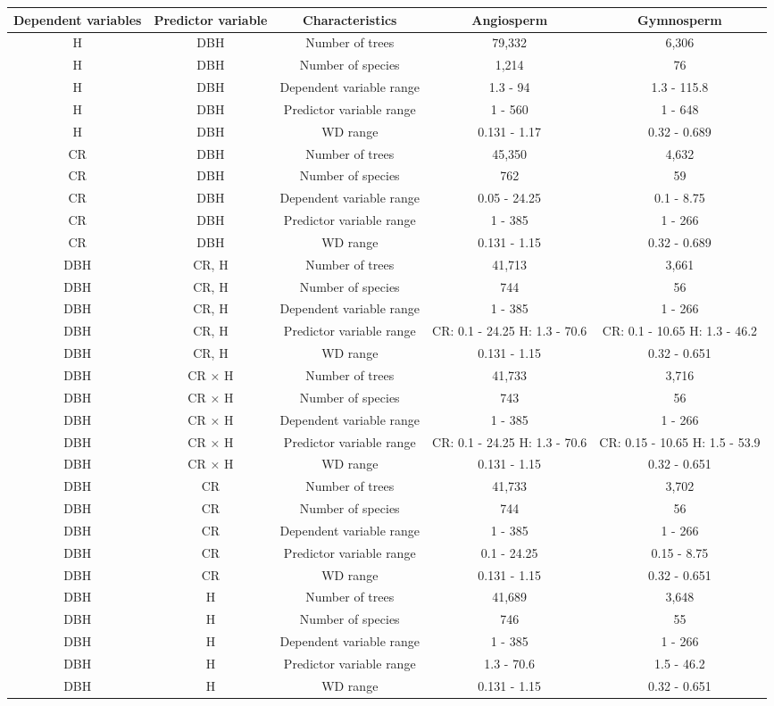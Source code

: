 \documentclass[
  12pt,
  letterpaper,
  DIV=11,
  numbers=noendperiod]{scrartcl}
\begin{document}
\begin{longtable*}[t]{ccccc}
\toprule
Dependent variables & Predictor variable & Characteristics & Angiosperm & Gymnosperm\\
\midrule
H & DBH & Number of trees & 79,332 & 6,306\\
H & DBH & Number of species & 1,214 & 76\\
H & DBH & Dependent variable range & 1.3 - 94 & 1.3 - 115.8\\
H & DBH & Predictor variable range & 1 - 560 & 1 - 648\\
H & DBH & WD range & 0.131 - 1.17 & 0.32 - 0.689\\
\addlinespace
CR & DBH & Number of trees & 45,350 & 4,632\\
CR & DBH & Number of species & 762 & 59\\
CR & DBH & Dependent variable range & 0.05 - 24.25 & 0.1 - 8.75\\
CR & DBH & Predictor variable range & 1 - 385 & 1 - 266\\
CR & DBH & WD range & 0.131 - 1.15 & 0.32 - 0.689\\
\addlinespace
DBH & CR, H & Number of trees & 41,713 & 3,661\\
DBH & CR, H & Number of species & 744 & 56\\
DBH & CR, H & Dependent variable range & 1 - 385 & 1 - 266\\
DBH & CR, H & Predictor variable range & CR: 0.1 - 24.25 H: 1.3 - 70.6 & CR: 0.1 - 10.65 H: 1.3 - 46.2\\
DBH & CR, H & WD range & 0.131 - 1.15 & 0.32 - 0.651\\
\addlinespace
DBH & CR × H & Number of trees & 41,733 & 3,716\\
DBH & CR × H & Number of species & 743 & 56\\
DBH & CR × H & Dependent variable range & 1 - 385 & 1 - 266\\
DBH & CR × H & Predictor variable range & CR: 0.1 - 24.25 H: 1.3 - 70.6 & CR: 0.15 - 10.65 H: 1.5 - 53.9\\
DBH & CR × H & WD range & 0.131 - 1.15 & 0.32 - 0.651\\
\addlinespace
DBH & CR & Number of trees & 41,733 & 3,702\\
DBH & CR & Number of species & 744 & 56\\
DBH & CR & Dependent variable range & 1 - 385 & 1 - 266\\
DBH & CR & Predictor variable range & 0.1 - 24.25 & 0.15 - 8.75\\
DBH & CR & WD range & 0.131 - 1.15 & 0.32 - 0.651\\
\addlinespace
DBH & H & Number of trees & 41,689 & 3,648\\
DBH & H & Number of species & 746 & 55\\
DBH & H & Dependent variable range & 1 - 385 & 1 - 266\\
DBH & H & Predictor variable range & 1.3 - 70.6 & 1.5 - 46.2\\
DBH & H & WD range & 0.131 - 1.15 & 0.32 - 0.651\\
\bottomrule
\end{longtable*}
\endgroup{}
\end{document}
